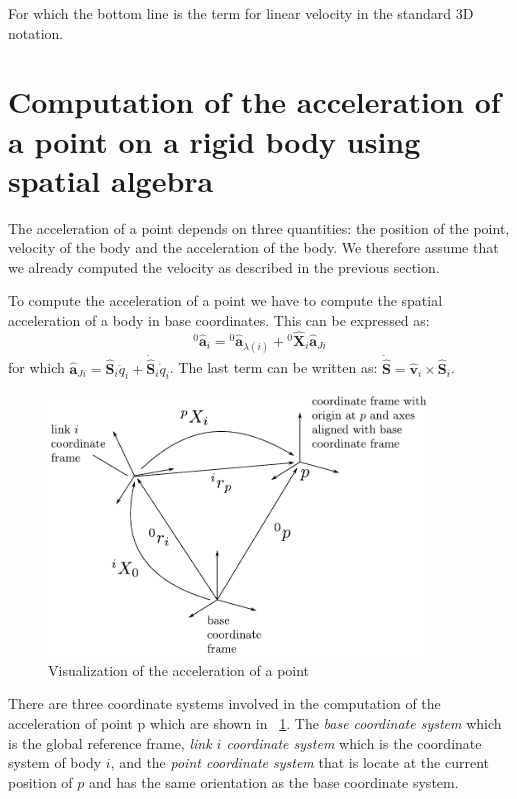 \documentclass[a4paper]{article}
\newcommand{\Spa}[1]{\mathbf{\hat{#1}}}
\newcommand{\figref}[1]{\figurename~\ref{#1}}
\begin{document}
For which the bottom line is the term for linear velocity in the standard 3D
notation.

\section{Computation of the acceleration of a point on a rigid body using
spatial algebra}

The acceleration of a point depends on three quantities: the position of the
point, velocity of the body and the acceleration of the body. We therefore
assume that we already computed the velocity as described in the previous
section.

To compute the acceleration of a point we have to compute the spatial
acceleration of a body in base coordinates. This can be expressed as:
\begin{equation}
	{}^0\Spa{a}_i = {}^0\Spa{a}_{\lambda(i)}
	+ {}^{0}\Spa{X}_{i} \Spa{a}_{Ji}
\end{equation}
for which $\Spa{a}_{Ji} = \Spa{S}_i \ddot{q}_i + \dot{\Spa{S}}_i \dot{q}_i$.
The last term can be written as: $\dot{\Spa{S}} = \Spa{v}_i \times \Spa{S}_i$.

\begin{figure}[h!]
	\begin{center}
		\includegraphics[width=0.9\textwidth]{acceleration_visualization}
	\end{center}
	\caption{Visualization of the acceleration of a point}
	\label{fig:acceleration_visualization}
\end{figure}

There are three coordinate systems involved in the computation of the
acceleration of point p which are shown in
\figref{fig:acceleration_visualization}. The \emph{base coordinate system}
which is the global reference frame, \emph{link $i$ coordinate system}
which is the coordinate system of body $i$, and the \emph{point coordinate
system} that is locate at the current position of $p$ and has the same
orientation as the base coordinate system.
\end{document}
